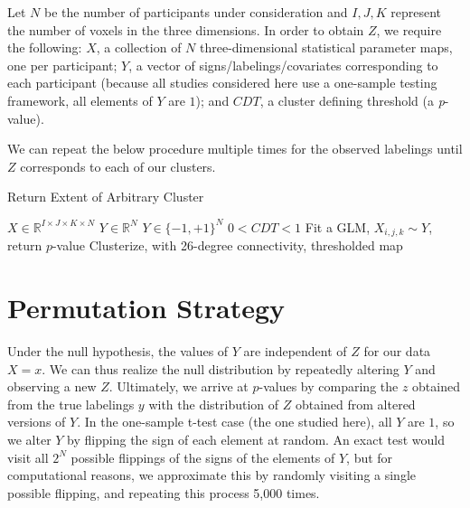 \documentclass{article}
\begin{document}
Let $N$ be the number of participants under consideration and $I, J, K$ represent the number of voxels in the three dimensions.
In order to obtain $Z$, we require the following: $X$, a collection of $N$ three-dimensional statistical parameter maps, one per participant; $Y$, a vector of signs/labelings/covariates corresponding to each participant (because all studies considered here use a one-sample testing framework, all elements of $Y$ are $1$); and $CDT$, a cluster defining threshold (a \textit{p}-value).

We can repeat the below procedure multiple times for the observed labelings until $Z$ corresponds to each of our clusters.

\begin{algorithm}[H]
  \caption{Return Extent of Arbitrary Cluster}
  \begin{algorithmic}[1]
    \REQUIRE $X \in \mathbb{R}^{I \times J \times K \times N}$
    \REQUIRE $Y \in \mathbb{R}^{N}$  $Y \in \{-1,+1\}^{N}$
    \REQUIRE $0 < CDT < 1$
    \STATE Fit a GLM, $X_{i,j,k} \sim Y$, return $p$-value
    \ELSE
    \ENDIF
    \ENDFOR
    \STATE Clusterize, with 26-degree connectivity, thresholded map
    \ELSE
    \ENDIF
  \end{algorithmic}
\end{algorithm}

\section{Permutation Strategy}
Under the null hypothesis, the values of $Y$ are independent of $Z$ for our data $X=x$.
We can thus realize the null distribution by repeatedly altering $Y$ and observing a new $Z$.
Ultimately, we arrive at $p$-values by comparing the $z$ obtained from the true labelings $y$ with the distribution of $Z$ obtained from altered versions of $Y$.
In the one-sample t-test case (the one studied here), all $Y$ are $1$, so we alter $Y$ by flipping the sign of each element at random.
An exact test would visit all $2^N$ possible flippings of the signs of the elements of $Y$, but for computational reasons, we approximate this by randomly visiting a single possible flipping, and repeating this process 5,000 times.
\end{document}

